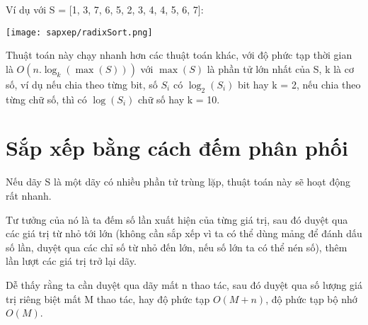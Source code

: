 Ví dụ với S = [1, 3, 7, 6, 5, 2, 3, 4, 4, 5, 6, 7]:

\texttt{[image: sapxep/radixSort.png]}

Thuật toán này chạy nhanh hơn các thuật toán khác, với độ phức tạp thời gian là $O(n.\log_k(\max(S)))$ với $\max(S)$ là phần tử lớn nhất của S, k là cơ số, ví dụ nếu chia theo từng bit, số $S_i$ có $\log_2(S_i)$ bit hay k = 2, nếu chia theo từng chữ số, thì có $\log(S_i)$ chữ số hay k = 10.

\section{Sắp xếp bằng cách đếm phân phối}
Nếu dãy S là một dãy có nhiều phần tử trùng lặp, thuật toán này sẽ hoạt động rất nhanh.

Tư tưởng của nó là ta đếm số lần xuất hiện của từng giá trị, sau đó duyệt qua các giá trị từ nhỏ tới lớn (không cần sắp xếp vì ta có thể dùng mảng để đánh dấu số lần, duyệt qua các chỉ số từ nhỏ đến lớn, nếu số lớn ta có thể nén số), thêm lần lượt các giá trị trở lại dãy.

Dễ thấy rằng ta cần duyệt qua dãy mất n thao tác, sau đó duyệt qua số lượng giá trị riêng biệt mất M thao tác, hay độ phức tạp $O(M + n)$, độ phức tạp bộ nhớ $O(M)$.